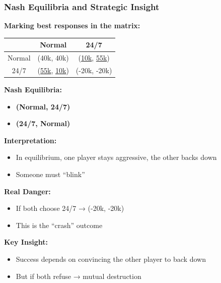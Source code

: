 \begin{frame}[fragile]\frametitle{Nash Equilibria and Strategic Insight}

\textbf{Marking best responses in the matrix:}

\begin{center}
\begin{tabular}{|c|c|c|}
  \hline
  & Normal & 24/7 \\
  \hline
  Normal & (40k, 40k) & (\underline{10k}, \underline{55k}) \\
  \hline
  24/7 & (\underline{55k}, \underline{10k}) & (-20k, -20k) \\
  \hline
\end{tabular}
\end{center}

\vspace{6pt}

\textbf{Nash Equilibria:}
\begin{itemize}
  \item \textbf{(Normal, 24/7)}
  \item \textbf{(24/7, Normal)}
\end{itemize}

\vspace{6pt}

\textbf{Interpretation:}
\begin{itemize}
  \item In equilibrium, one player stays aggressive, the other backs down
  \item Someone must “blink”
\end{itemize}

\vspace{6pt}

\textbf{Real Danger:}
\begin{itemize}
  \item If both choose 24/7 → (-20k, -20k)
  \item This is the “crash” outcome
\end{itemize}

\vspace{6pt}

\textbf{Key Insight:}
\begin{itemize}
  \item Success depends on convincing the other player to back down
  \item But if both refuse → mutual destruction
\end{itemize}

\end{frame}

